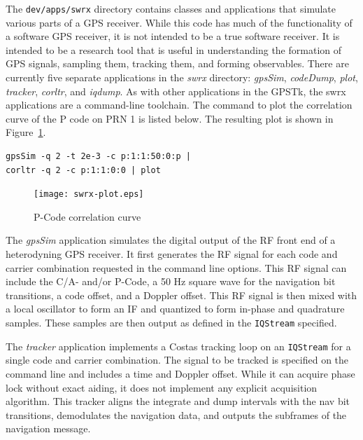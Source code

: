 \documentclass[letterpaper,ugly,10pt]{ion-gps}
\newcommand{\gpstkapp}[1]{\textit{\mbox{#1}}}
\newcommand{\gpstkdir}[1]{\texttt{\mbox{#1}}}
\newcommand{\gpstkclass}[1]{\texttt{\mbox{#1}}}
\begin{document}
The \gpstkdir{dev/apps/swrx} directory contains classes and applications that simulate various parts of a GPS receiver. While this code has much of the functionality of a software GPS receiver, it is not intended to be a true software receiver. It is intended to be a research tool that is useful in understanding the formation of GPS signals, sampling them, tracking them, and forming observables. There are currently five separate applications in the \gpstkapp{swrx} directory: \gpstkapp{gpsSim}, \gpstkapp{codeDump}, \gpstkapp{plot}, \gpstkapp{tracker}, \gpstkapp{corltr}, and \gpstkapp{iqdump}. As with other applications in the GPSTk, the swrx applications are a command-line toolchain. The command to plot the correlation curve of the P code on PRN 1 is listed below. The resulting plot is shown in Figure~\ref{fig:swrxcorrcurve}.

\begin{scriptsize}
\begin{lstlisting}
gpsSim -q 2 -t 2e-3 -c p:1:1:50:0:p | 
corltr -q 2 -c p:1:1:0:0 | plot
\end{lstlisting}
\end{scriptsize}

\begin{figure}
	\centering
	\texttt{[image: swrx-plot.eps]}
	\caption{P-Code correlation curve}
	\label{fig:swrxcorrcurve}
\end{figure}

The \gpstkapp{gpsSim} application simulates the digital output of the RF front end of a heterodyning GPS receiver. It first generates the RF signal for each code and carrier combination requested in the command line options. This RF signal can include the C/A- and/or P-Code, a 50 Hz square wave for the navigation bit transitions, a code offset, and a Doppler offset. This RF signal is then mixed with a local oscillator to form an IF and quantized to form in-phase and quadrature samples. These samples are then output as defined in the \gpstkclass{IQStream} specified.

The \gpstkapp{tracker} application implements a Costas tracking loop on an \gpstkclass{IQStream} for a single code and carrier combination. The signal to be tracked is specified on the command line and includes a time and Doppler offset. While it can acquire phase lock without exact aiding, it does not implement any explicit acquisition algorithm. This tracker aligns the integrate and dump intervals with the nav bit transitions, demodulates the navigation data, and outputs the subframes of the navigation message.
\end{document}
